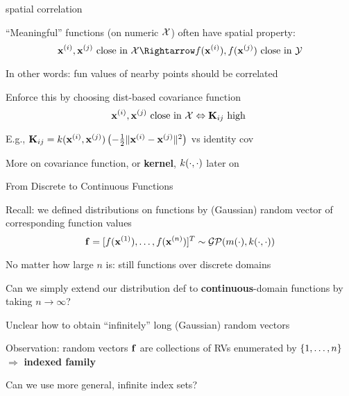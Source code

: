 \documentclass[11pt,compress,t,notes=noshow, xcolor=table]{beamer}
\begin{document}
\begin{framei}{spatial correlation}
\item ``Meaningful'' functions (on numeric $\Xspace$) often have spatial property:
$$\xi, \xi[j] \text{ close in } \Xspace \Rightarrow f(\xi), f(\xi[j]) \text{ close in } \Yspace$$
\item In other words: fun values of nearby points should be correlated
\item Enforce this by choosing dist-based covariance function
$$ \xi[i], \xi[j] \text{ close in } \Xspace \Leftrightarrow \Kmat_{ij} \text{ high }$$
\item E.g., $\Kmat_{ij} = \kxij = \exp \left(- \tfrac{1}{2} \| \xi - \xi[j] \|^2 \right)$ vs identity cov
\vfill
{}
\item More on covariance function, or \textbf{kernel}, $\kcc$ later on
\end{framei} 

\begin{framei}[sep=L]{From Discrete to Continuous Functions}
\item Recall: we defined distributions on functions by (Gaussian) random vector of corresponding function values 
$$\fv = \fvec^T \sim \GPmk$$
\item No matter how large $n$ is: still functions over discrete domains
\item Can we simply extend our distribution def to \textbf{continuous}-domain functions by taking $n \rightarrow \infty$?
\item Unclear how to obtain ``infinitely'' long (Gaussian) random vectors
\item Observation: random vectors $\fv$ are collections of RVs enumerated by $\nset$ $\Rightarrow$ \textbf{indexed family} 
\item Can we use more general, infinite index sets?
\end{framei}
\end{document}
